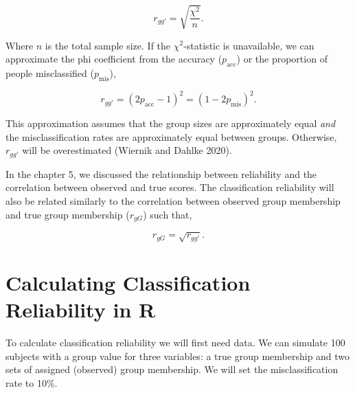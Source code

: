 \documentclass[
  letterpaper,
  DIV=11,
  numbers=noendperiod]{scrreprt}
\begin{document}
\[
r_{gg'} = \sqrt{\frac{\chi^2}{n}}.
\]

Where \(n\) is the total sample size. If the \(\chi^2\)-statistic is
unavailable, we can approximate the phi coefficient from the accuracy
(\(p_{\text{acc}}\)) or the proportion of people misclassified
(\(p_{\text{mis}}\)),

\[
r_{gg'} = (2p_{\text{acc}}-1)^2 = (1-2p_{\text{mis}})^2.
\]

This approximation assumes that the group sizes are approximately equal
\emph{and} the misclassification rates are approximately equal between
groups. Otherwise, \(r_{gg'}\) will be overestimated (Wiernik and Dahlke
2020).

In the chapter 5, we discussed the relationship between reliability and
the correlation between observed and true scores. The classification
reliability will also be related similarly to the correlation between
observed group membership and true group membership (\(r_{gG}\)) such
that,

\[
r_{gG}=\sqrt{r_{gg'}}.
\]

\hypertarget{calculating-classification-reliability-in-r}{%
\section{Calculating Classification Reliability in
R}\label{calculating-classification-reliability-in-r}}

To calculate classification reliability we will first need data. We can
simulate 100 subjects with a group value for three variables: a true
group membership and two sets of assigned (observed) group membership.
We will set the misclassification rate to 10\%.
\end{document}
